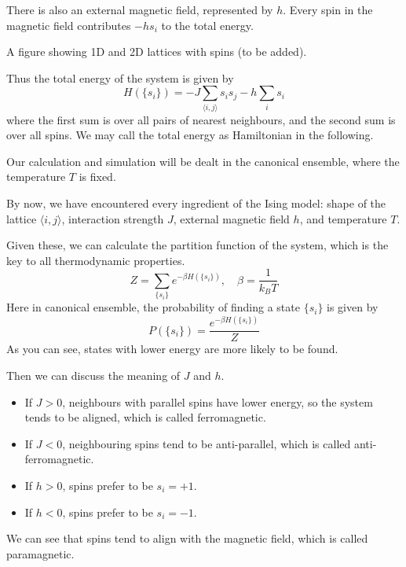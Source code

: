 \documentclass[11pt]{article}
\begin{document}
	There is also an external magnetic field, represented by $h$.
	Every spin in the magnetic field contributes $-h s_i$ to the total energy.

	A figure showing 1D and 2D lattices with spins (to be added).

	Thus the total energy of the system is given by
	\begin{equation}
		H(\{s_i\}) = -J \sum_{\langle i,j \rangle} s_i s_j - h \sum_i s_i
	\end{equation}
	where the first sum is over all pairs of nearest neighbours, and the second sum is over all spins.
	We may call the total energy as Hamiltonian in the following.
	
	Our calculation and simulation will be dealt in the canonical ensemble, where the temperature $T$ is fixed.

	By now, we have encountered every ingredient of the Ising model: 
	shape of the lattice $\langle i,j \rangle$, interaction strength $J$, external magnetic field $h$, and temperature $T$.
	
	Given these, we can calculate the partition function of the system, which is the key to all thermodynamic properties.
	\begin{equation}
		Z = \sum_{\{s_i\}} e^{-\beta H(\{s_i\})}, \quad \beta = \frac{1}{k_B T}
	\end{equation}
	Here in canonical ensemble, the probability of finding a state $\{s_i\}$ is given by
	\begin{equation}
		P(\{s_i\}) = \frac{e^{-\beta H(\{s_i\})}}{Z}
	\end{equation}
	As you can see, states with lower energy are more likely to be found.

	Then we can discuss the meaning of $J$ and $h$.
	\begin{itemize}
		\item If $J > 0$, neighbours with parallel spins have lower energy, so the system tends to be aligned, which is called ferromagnetic.
		\item If $J < 0$, neighbouring spins tend to be anti-parallel, which is called anti-ferromagnetic.
	\end{itemize}
	\begin{itemize}
		\item If $h > 0$, spins prefer to be $s_i = +1$.
		\item If $h < 0$, spins prefer to be $s_i = -1$.
	\end{itemize}
	We can see that spins tend to align with the magnetic field, which is called paramagnetic.
\end{document}
